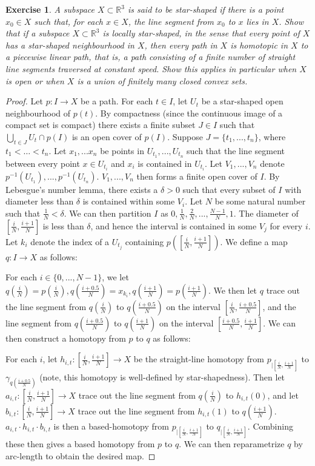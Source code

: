 \documentclass{article}
\newtheorem{exercise}{Exercise}[subsection]
\begin{document}
\begin{exercise}
A subspace $X\subset\mathbb{R}^3$ is said to be star-shaped if there is a point $x_0\in X$ such that, for each $x\in X$, the line segment from $x_0$ to $x$ lies in $X$. Show that if a subspace $X\subset\mathbb{R}^3$ is locally star-shaped, in the sense that every point of $X$ has a star-shaped neighbourhood in $X$, then every path in $X$ is homotopic in $X$ to a piecewise linear path, that is, a path consisting of a finite number of straight line segments traversed at constant speed. Show this applies in particular when $X$ is open or when $X$ is a union of finitely many closed convex sets.
\end{exercise}
\begin{proof}
Let $p:I\to X$ be a path. For each $t\in I$, let $U_t$ be a star-shaped open neighbourhood of $p(t)$. By compactness (since the continuous image of a compact set is compact) there exists a finite subset $J\in I$ such that $\bigcup_{t\in J}U_t\cap p(I)$ is an open cover of $p(I)$. Suppose $J=\{t_1,...,t_n\}$, where $t_1<\dots<t_n$. Let $x_1,...x_n$ be points in $U_{t_1},...,U_{t_n}$ such that the line segment between every point $x\in U_{t_i}$ and $x_i$ is contained in $U_{t_i}$. Let $V_1,...,V_n$ denote $p^{-1}(U_{t_1}),...,p^{-1}(U_{t_n})$. $V_1,...,V_n$ then forms a finite open cover of $I$. By Lebesgue's number lemma, there exists a $\delta > 0$ such that every subset of $I$ with diameter less than $\delta$ is contained within some $V_i$. Let $N$ be some natural number such that $\frac{1}{N}<\delta$. We can then partition $I$ as $0,\frac{1}{N},\frac{2}{N},...,\frac{N-1}{N},1$. The diameter of $[\frac{i}{N},\frac{i+1}{N}]$ is less than $\delta$, and hence the interval is contained in some $V_j$ for every $i$. Let $k_i$ denote the index of a $U_{t_{j}}$ containing $p([\frac{i}{N},\frac{i+1}{N}])$. We define a map $q:I\to X$ as follows:

For each $i\in\{0,...,N-1\}$, we let $q(\frac{i}{N})=p(\frac{i}{N}),q(\frac{i+0.5}{N})=x_{k_i},q(\frac{i+1}{N})=p(\frac{i+1}{N})$. We then let $q$ trace out the line segment from $q(\frac{i}{N})$ to $q(\frac{i+0.5}{N})$ on the interval $[\frac{i}{N},\frac{i+0.5}{N}]$, and the line segment from $q(\frac{i+0.5}{N})$ to $q(\frac{i+1}{N})$ on the interval $[\frac{i+0.5}{N},\frac{i+1}{N}]$. We can then construct a homotopy from $p$ to $q$ as follows:

For each $i$, let $h_{i,t}:[\frac{i}{N},\frac{i+1}{N}]\to X$ be the straight-line homotopy from $p_{|[\frac{i}{N},\frac{i+1}{N}]}$ to $\gamma_{q(\frac{i+0.5}{N})}$ (note, this homotopy is well-defined by star-shapedness). Then let $a_{i,t}:[\frac{i}{N},\frac{i+1}{N}]\to X$ trace out the line segment from $q(\frac{i}{N})$ to $h_{i,t}(0)$, and let $b_{i,t}:[\frac{i}{N},\frac{i+1}{N}]\to X$ trace out the line segment from $h_{i,t}(1)$ to $q(\frac{i+1}{N})$. $a_{i,t}\cdot h_{i,t}\cdot b_{i,t}$ is then a based-homotopy from $p_{|[\frac{i}{N},\frac{i+1}{N}]}$ to $q_{|[\frac{i}{N},\frac{i+1}{N}]}$. Combining these then gives a based homotopy from $p$ to $q$. We can then reparametrize $q$ by arc-length to obtain the desired map.



\end{proof}
\end{document}
